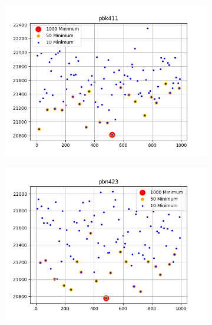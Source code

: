 \documentclass{article}
\def\v{0.4}
\begin{document}
\begin{figure}[h!]
	\centering
	\begin{subfigure}[b]{\v\linewidth}
		\includegraphics[width=\linewidth]{graphs/min_pbk411.png}
	\end{subfigure}
	\begin{subfigure}[b]{\v\linewidth}
		\includegraphics[width=\linewidth]{graphs/min_pbn423.png}
	\end{subfigure}
	\begin{subfigure}[b]{\v\linewidth}

\end{subfigure}
\end{figure}
\end{document}
